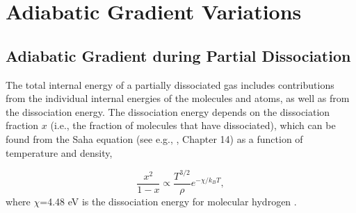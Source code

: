 \documentclass[apj]{emulateapj}
\begin{document}
%
%
%
%


 





\section{Adiabatic Gradient Variations}
\label{alldelad}

\subsection{Adiabatic Gradient during Partial Dissociation}\label{deladdiss}



The total internal energy of a partially dissociated gas includes contributions from the individual internal energies of the molecules and atoms, as well as from the dissociation energy. The dissociation energy depends on the dissociation fraction $x$ (i.e., the fraction of molecules that have dissociated), which can be found from the Saha equation (see e.g., \citealt{kippenhahn90}, Chapter 14) as a function of temperature and density,

\begin{equation}
\label{eq:saha}
\frac{x^2}{1-x} \propto \frac{T^{3/2}}{\rho} e^{-\chi/k_B T},
\end{equation} 
where $\chi$=4.48 eV is the dissociation energy for molecular hydrogen \citep{blanksby03}.
\end{document}
